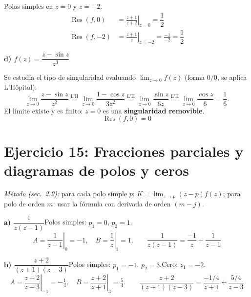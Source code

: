 \documentclass[10pt,a4paper]{article}
\begin{document}
Polos simples en $z=0$ y $z=-2$.
\begin{align*}
	\operatorname{Res}(f,0) &= \left.\frac{z+1}{z+2}\right|_{z=0} = \boxed{\dfrac{1}{2}} \\[4pt]
	\operatorname{Res}(f,-2) &= \left.\frac{z+1}{z}\right|_{z=-2} = \frac{-1}{-2} = \boxed{\dfrac{1}{2}}
\end{align*}

\bigskip

\noindent\textbf{d) $f(z) = \dfrac{z-\sin z}{z^3}$}

Se estudia el tipo de singularidad evaluando $\lim_{z\to 0}f(z)$ (forma $0/0$, se aplica L'Hôpital):
\[
	\lim_{z\to 0}\frac{z-\sin z}{z^3}
	\overset{\text{L'H}}{=} \lim_{z\to 0}\frac{1-\cos z}{3z^2}
	\overset{\text{L'H}}{=} \lim_{z\to 0}\frac{\sin z}{6z}
	\overset{\text{L'H}}{=} \lim_{z\to 0}\frac{\cos z}{6} = \frac{1}{6}.
\]
El límite existe y es finito: $z=0$ es una \textbf{singularidad removible}.
\[
	\boxed{\operatorname{Res}(f,0) = 0}
\]


\section*{Ejercicio 15: Fracciones parciales y diagramas de polos y ceros}

\noindent\textit{Método (sec.~2.9):} para cada polo simple $p$: $K = \lim_{z\to p}(z-p)f(z)$; para polo de orden $m$: usar la fórmula con derivada de orden $(m-j)$.

\medskip

\noindent\textbf{a) $\dfrac{1}{z(z-1)}$}\quad Polos simples: $p_1=0$, $p_2=1$.
\[
	A = \left.\frac{1}{z-1}\right|_0 = -1,\quad
	B = \left.\frac{1}{z}\right|_1 = 1.
	\qquad
	\boxed{\frac{1}{z(z-1)} = \frac{-1}{z} + \frac{1}{z-1}}
\]

\begin{figure}[H]
\centering

\end{figure}


\medskip

\noindent\textbf{b) $\dfrac{z+2}{(z+1)(z-3)}$}\quad Polos simples: $p_1=-1$, $p_2=3$.\quad Cero: $z_1=-2$.
\[
	A = \left.\frac{z+2}{z-3}\right|_{-1} = -\tfrac{1}{4},\quad
	B = \left.\frac{z+2}{z+1}\right|_{3} = \tfrac{5}{4}.
	\qquad
	\boxed{\frac{z+2}{(z+1)(z-3)} = \frac{-1/4}{z+1} + \frac{5/4}{z-3}}
\]
\end{document}
